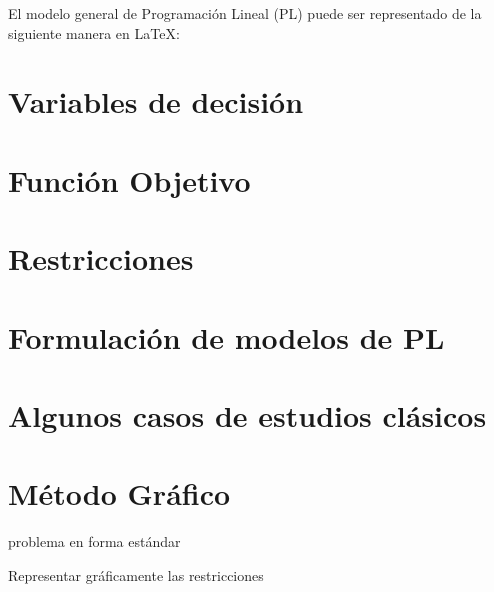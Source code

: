 \documentclass[
  letterpaper,
  DIV=11,
  numbers=noendperiod]{scrreprt}
\theoremstyle{definition}
\theoremstyle{definition}
\theoremstyle{remark}
\begin{document}
El modelo general de Programación Lineal (PL) puede ser representado de
la siguiente manera en LaTeX:

\hypertarget{variables-de-decisiuxf3n}{%
\section{Variables de decisión}\label{variables-de-decisiuxf3n}}

\hypertarget{funciuxf3n-objetivo}{%
\section{Función Objetivo}\label{funciuxf3n-objetivo}}

\hypertarget{restricciones}{%
\section{Restricciones}\label{restricciones}}

\hypertarget{formulaciuxf3n-de-modelos-de-pl}{%
\section{Formulación de modelos de
PL}\label{formulaciuxf3n-de-modelos-de-pl}}

\hypertarget{algunos-casos-de-estudios-cluxe1sicos}{%
\section{Algunos casos de estudios
clásicos}\label{algunos-casos-de-estudios-cluxe1sicos}}

\hypertarget{muxe9todo-gruxe1fico}{%
\section{Método Gráfico}\label{muxe9todo-gruxe1fico}}

problema en forma estándar

Representar gráficamente las restricciones

\end{document}
